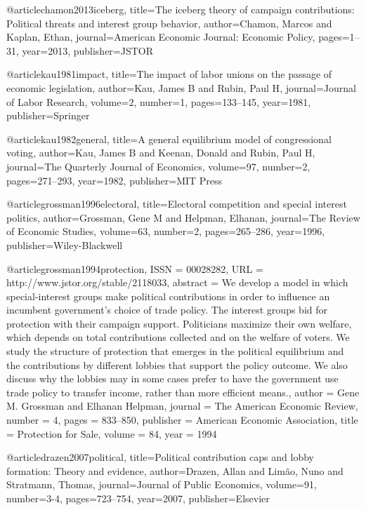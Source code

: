 @article{chamon2013iceberg,
  title={The iceberg theory of campaign contributions: Political threats and interest group behavior},
  author={Chamon, Marcos and Kaplan, Ethan},
  journal={American Economic Journal: Economic Policy},
  pages={1--31},
  year={2013},
  publisher={JSTOR}
}

@article{kau1981impact,
  title={The impact of labor unions on the passage of economic legislation},
  author={Kau, James B and Rubin, Paul H},
  journal={Journal of Labor Research},
  volume={2},
  number={1},
  pages={133--145},
  year={1981},
  publisher={Springer}
}

@article{kau1982general,
  title={A general equilibrium model of congressional voting},
  author={Kau, James B and Keenan, Donald and Rubin, Paul H},
  journal={The Quarterly Journal of Economics},
  volume={97},
  number={2},
  pages={271--293},
  year={1982},
  publisher={MIT Press}
}

@article{grossman1996electoral,
  title={Electoral competition and special interest politics},
  author={Grossman, Gene M and Helpman, Elhanan},
  journal={The Review of Economic Studies},
  volume={63},
  number={2},
  pages={265--286},
  year={1996},
  publisher={Wiley-Blackwell}
}

@article{grossman1994protection,
 ISSN = {00028282},
 URL = {http://www.jstor.org/stable/2118033},
 abstract = {We develop a model in which special-interest groups make political contributions in order to influence an incumbent government's choice of trade policy. The interest groups bid for protection with their campaign support. Politicians maximize their own welfare, which depends on total contributions collected and on the welfare of voters. We study the structure of protection that emerges in the political equilibrium and the contributions by different lobbies that support the policy outcome. We also discuss why the lobbies may in some cases prefer to have the government use trade policy to transfer income, rather than more efficient means.},
 author = {Gene M. Grossman and Elhanan Helpman},
 journal = {The American Economic Review},
 number = {4},
 pages = {833--850},
 publisher = {American Economic Association},
 title = {Protection for Sale},
 volume = {84},
 year = {1994}
}

@article{drazen2007political,
  title={Political contribution caps and lobby formation: Theory and evidence},
  author={Drazen, Allan and Lim{\~a}o, Nuno and Stratmann, Thomas},
  journal={Journal of Public Economics},
  volume={91},
  number={3-4},
  pages={723--754},
  year={2007},
  publisher={Elsevier}
}

